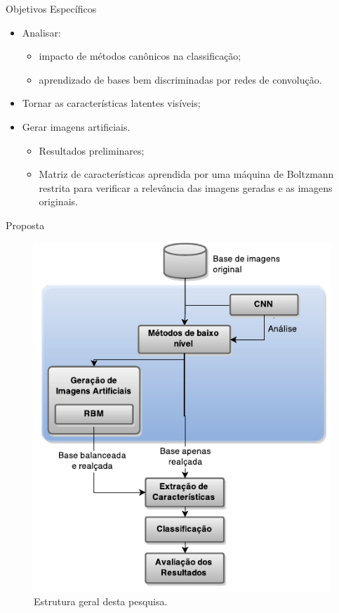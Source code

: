 \documentclass{beamer}
\begin{document}
\begin{frame}{Objetivos Específicos}
\setlength\leftmargini{1em}
\justifying
    \begin{itemize}
      \item Analisar: 
        \begin{itemize}
          \item impacto de métodos canônicos na classificação;
          \item aprendizado de bases bem discriminadas por redes de convolução.
        \end{itemize}
      \item Tornar as características latentes visíveis;%
      \item Gerar imagens artificiais. 
      \pause
        \begin{itemize}
          \item Resultados preliminares;
          \item Matriz de características aprendida por uma máquina de Boltzmann restrita para verificar a relevância das imagens geradas e as imagens originais.
        \end{itemize}
    \end{itemize}
\end{frame}
\begin{frame}{Proposta}
\begin{figure}
    \includegraphics[height=0.75\textheight]{figuras/geral.pdf}
    \caption{Estrutura geral desta pesquisa.}
\end{figure}
\end{frame}
\end{document}
